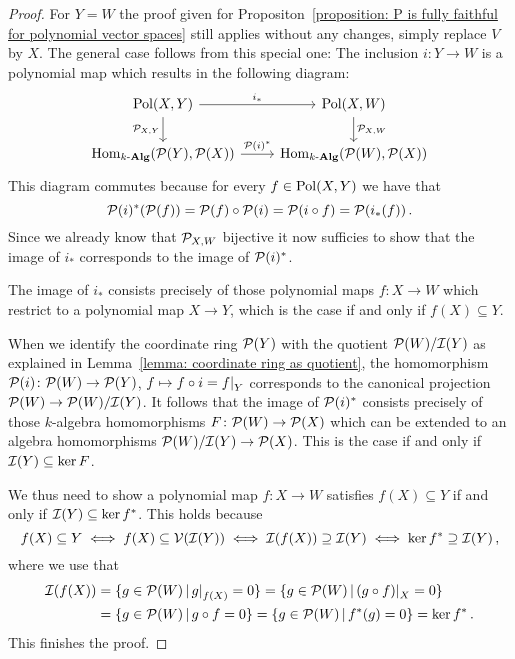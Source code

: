 \begin{proof}
  For $Y = W$ the proof given for Propositon~\ref{proposition: P is fully faithful for polynomial vector spaces} still applies without any changes, simply replace $V$ by $X$.
  The general case follows from this special one:
  The inclusion $i \colon Y \to W$ is a polynomial map which results in the following diagram:
  \[
    \begin{tikzcd}
        \Pol(X,Y)
        \arrow{r}[above]{i_*}
        \arrow{d}[left]{\mc{P}_{X,Y}}
      & \Pol(X,W)
        \arrow{d}[right]{\mc{P}_{X,W}}
      \\
        \Hom_{\cAlg{k}}(\mc{P}(Y), \mc{P}(X))
        \arrow{r}[above]{\mc{P}(i)^*}
      & \Hom_{\cAlg{k}}(\mc{P}(W), \mc{P}(X))
    \end{tikzcd}
  \]
  This diagram commutes because for every $f \in \operatorname{Pol}(X,Y)$ we have that
  \[
      \mathcal{P}(i)^*( \mathcal{P}(f) )
    = \mathcal{P}(f) \circ \mathcal{P}(i)
    = \mathcal{P}( i \circ f )
    = \mathcal{P}( i_*(f) ) \,.
  \]
  Since we already know that $\mathcal{P}_{X,W}$ bijective it now sufficies to show that the image of $i_*$ corresponds to the image of $\mathcal{P}(i)^*$.
  
  The image of $i_*$ consists precisely of those polynomial maps $f \colon X \to W$ which restrict to a polynomial map $X \to Y$, which is the case if and only if $f(X) \subseteq Y$.
  
  When we identify the coordinate ring $\mathcal{P}(Y)$ with the quotient $\mathcal{P}(W)/\mathcal{I}(Y)$ as explained in Lemma~\ref{lemma: coordinate ring as quotient}, the homomorphism $\mathcal{P}(i) \colon \mathcal{P}(W) \to \mathcal{P}(Y)$, $f \mapsto f \circ i = \restrict{f}{Y}$ corresponds to the canonical projection $\mathcal{P}(W) \to \mathcal{P}(W)/\mathcal{I}(Y)$.
  It follows that the image of $\mathcal{P}(i)^*$ consists precisely of those $k$-algebra homomorphisms $F \colon \mathcal{P}(W) \to \mathcal{P}(X)$ which can be extended to an algebra homomorphisms $\mathcal{P}(W)/\mathcal{I}(Y) \to \mathcal{P}(X)$.
  This is the case if and only if $\mathcal{I}(Y) \subseteq \ker F$.
  
  We thus need to show a polynomial map $f \colon X \to W$ satisfies $f(X) \subseteq Y$ if and only if $\mathcal{I}(Y) \subseteq \ker f^*$.
  This holds because
  \[
          f(X) \subseteq Y
    \iff  f(X) \subseteq \mathcal{V}(\mathcal{I}(Y))
    \iff  \mathcal{I}(f(X)) \supseteq \mathcal{I}(Y)
    \iff  \ker f^* \supseteq \mathcal{I}(Y) \,,
  \]
  where we use that
  \begin{align*}
        \mc{I}(f(X))
    &=  \{
          g \in \mc{P}(W)
        \suchthat
          \restrict{g}{f(X)} = 0
        \}
      = \{
          g \in \mc{P}(W)
        \suchthat
          \restrict{(g \circ f)}{X} = 0
        \}
    \\
    &=  \{
          g \in \mc{P}(W)
        \suchthat
          g \circ f = 0
        \}
      = \{
          g \in \mc{P}(W)
        \suchthat
          f^*(g) = 0
        \}
      = \ker f^* \,.
  \end{align*}
  This finishes the proof.
\end{proof}


